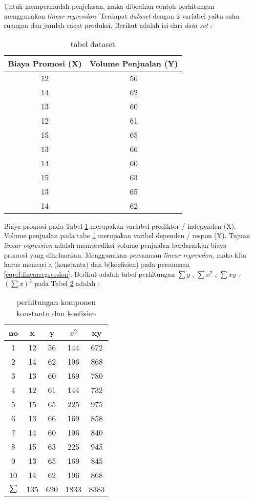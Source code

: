 Untuk mempermudah penjelasan, maka diberikan contoh perhitungan menggunakan \textit{linear regression}. Terdapat \textit{dataset} dengan 2 variabel yaitu suhu ruangan dan jumlah cacat produksi. Berikut adalah isi dari \textit{data set} : 

\begin{table}[ht]
\centering
\begin{tabular}{|c|c|}
\hline 
Biaya Promosi (X) & Volume Penjualan (Y) \\ 
\hline 
12 & 56 \\ 
\hline 
14 & 62 \\ 
\hline 
13 & 60 \\ 
\hline 
12 & 61 \\ 
\hline 
15 & 65 \\ 
\hline 
13 & 66 \\ 
\hline 
14 & 60 \\ 
\hline 
15 & 63 \\ 
\hline 
13 & 65 \\ 
\hline 
14 & 62 \\ 
\hline 
\end{tabular} 
\caption{tabel dataset }
\label{tab:dataset}
\end{table}
\pagebreak
Biaya promosi pada Tabel \ref{tab:dataset} merupakan variabel prediktor / independen (X). Volume penjualan pada tabe \ref{tab:dataset} merupakan varibel dependen / respon (Y). Tujuan \textit{linear regression} adalah memprediksi volume penjualan berdasarkan biaya promosi yang dikeluarkan. Menggunakan persamaan \textit{linear regression}, maka kita harus mencari a (konstanta) dan b(koefisien) pada persamaan \ref{eqref:linearregression}. Berikut adalah tabel perhitungan $\sum y$  , $\sum x^2$ , $\sum xy$ , $(\sum x)^2$ pada Tabel \ref{tab:konstantakoefisienlinear} adalah :
\begin{table}[ht]
\centering
\begin{tabular}{|c|c|c|c|c|}
\hline 
no & x & y & $x^2$ & xy \\ 
\hline 
1 & 12 & 56 & 144 & 672 \\ 
\hline 
2 & 14 & 62 & 196 & 868 \\ 
\hline 
3 & 13 & 60 & 169 & 780 \\ 
\hline 
4 & 12 & 61 & 144 & 732 \\ 
\hline 
5 & 15 & 65 & 225 & 975 \\ 
\hline 
6 & 13 & 66 & 169 & 858 \\ 
\hline 
7 & 14 & 60 & 196 & 840 \\ 
\hline 
8 & 15 & 63 & 225 & 945 \\ 
\hline 
9 & 13 & 65 & 169 & 845 \\ 
\hline 
10 & 14 & 62 & 196 & 868 \\ 
\hline 
$\sum $ & 135 & 620 & 1833 & 8383 \\ 
\hline 
\end{tabular} 
\caption{ perhitungan komponen konstanta dan koefisien}
\label{tab:konstantakoefisienlinear}
\end{table} 

